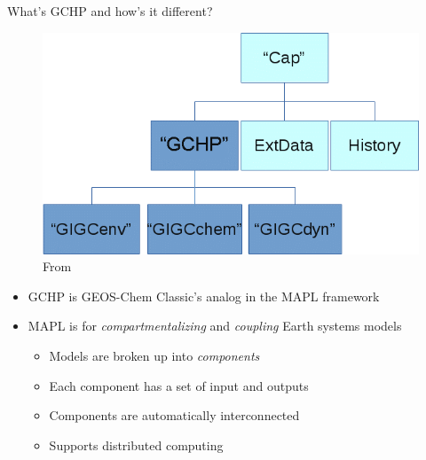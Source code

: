 \documentclass[10pt]{beamer}
\begin{document}
\begin{frame}{What's GCHP and how's it different?}
    \begin{minipage}[c]{0.39\textwidth}
        \begin{figure}
            \centering
            \includegraphics[width=\textwidth]{gchp_components.png}
            \captionsetup{labelformat=empty}
            \caption{From \cite{geos-chem_developers_developing_2019}}
        \end{figure}
    \end{minipage}
    \begin{minipage}[c]{0.6\textwidth}
        \begin{itemize}
            \item GCHP is GEOS-Chem Classic's analog in the MAPL framework
            \item MAPL is for \textit{compartmentalizing} and \textit{coupling} Earth systems models 
            \begin{itemize}
                \item Models are broken up into \textit{components}
                \item Each component has a set of input and outputs
                \item Components are automatically interconnected
                \item Supports distributed computing
            \end{itemize}
        \end{itemize}
    \end{minipage}
\end{frame}
\end{document}
